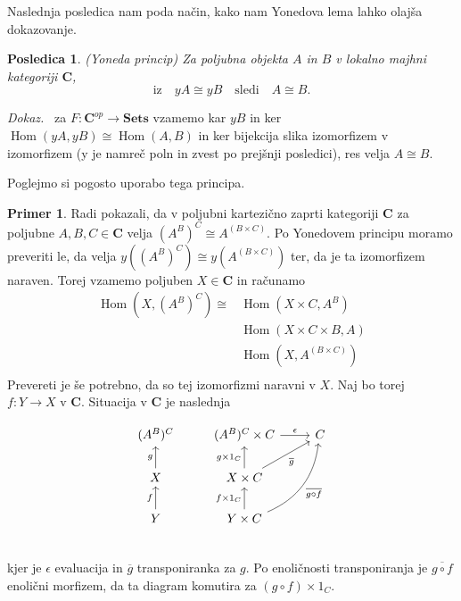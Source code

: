 \documentclass[12pt,a4paper]{book}
\theoremstyle{definition}
\theoremstyle{plain}
\newtheorem{posledica}{Posledica}
\newenvironment{dokaz}{\emph{Dokaz.}\ }{\hspace{\fill}{$\Box$}}
\theoremstyle{definition}
\newtheorem{primer}{Primer}[section]
\theoremstyle{remark}
\newcommand{\cat}[1]{\textbf{#1}}
\DeclareMathOperator{\Hom}{Hom}
\begin{document}
Naslednja posledica nam poda način, kako nam Yonedova lema lahko olajša dokazovanje.

\begin{posledica} \emph{(Yoneda princip)}
Za poljubna objekta $A$ in $B$ v lokalno majhni kategoriji $\cat{C}$,
$$\text{iz} \quad yA \cong yB \quad\text{sledi}\quad A \cong B .$$
\end{posledica}
\begin{dokaz}
za $F : \cat{C}^{op} \to \cat{Sets}$ vzamemo kar $yB$ in ker $\Hom(yA,yB) \cong \Hom(A,B)$ in ker bijekcija slika izomorfizem v izomorfizem (y je namreč poln in zvest po prejšnji posledici), res velja $A \cong B$.
\end{dokaz}


Poglejmo si pogosto uporabo tega principa.

\begin{primer}
Radi pokazali, da v poljubni kartezično zaprti kategoriji $\cat{C}$ za poljubne $A,B,C \in \cat{C}$ velja $(A^B)^C \cong A^{(B \times C)}$.
Po Yonedovem principu moramo preveriti le, da velja $y((A^B)^C) \cong y(A^{(B \times C)})$ ter, da je ta izomorfizem naraven. Torej vzamemo poljuben $X \in \cat{C}$ in računamo
\begin{align*}
\Hom(X, (A^B)^C) \cong &\Hom(X \times C, A^B) \\
&\Hom(X \times C \times B, A) \\
&\Hom(X, A^{(B \times C)}) \\
\end{align*}
Prevereti je še potrebno, da so tej izomorfizmi naravni v $X$.
Naj bo torej $f : Y \to X$ v $ \cat{C}$. Situacija v $\cat{C}$ je naslednja

\begin{equation}
\begin{tikzcd}
(A^B)^C & (A^B)^C \times C \ar[r, "\epsilon"] & C \\
X \ar[u, "g"] & X \times C \ar[u, "g \times 1_C"] \ar[ur, "\overline{g}"'] & \\
Y \ar[u, "f"] & Y \times C \ar[u, "f \times 1_C"] \ar[uur, bend right, "\overline{g \circ f}"'] & \\
\end{tikzcd}
\end{equation}
kjer je $\epsilon$ evaluacija in $\overline{g}$ transponiranka za $g$. Po enoličnosti transponiranja je $\overline{g \circ f}$ enolični morfizem, da ta diagram komutira za $(g \circ f) \times 1_C$.


\end{primer}
\end{document}
